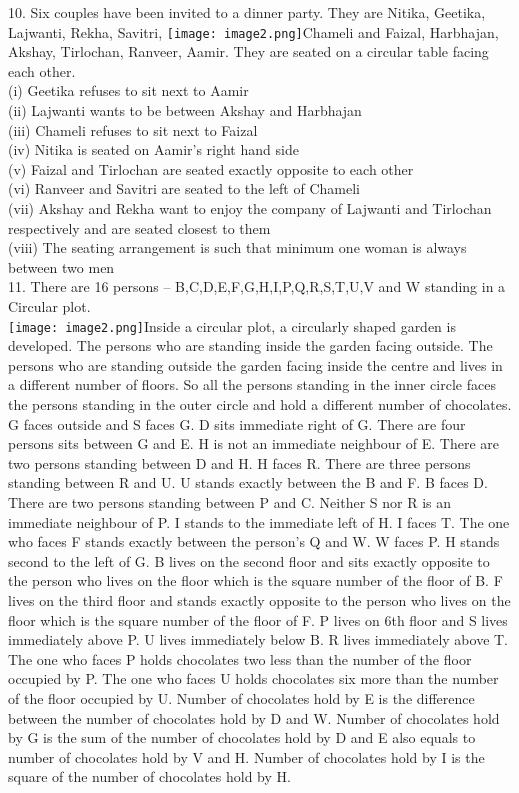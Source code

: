 \documentclass[
]{article}
\begin{document}
10. Six couples have been invited to a dinner party. They are Nitika, Geetika, Lajwanti, Rekha,
Savitri, \texttt{[image: image2.png]}Chameli and Faizal, Harbhajan, Akshay, Tirlochan, Ranveer, Aamir. They are seated
on a circular table facing each other.\\
(i) Geetika refuses to sit next to Aamir\\
(ii) Lajwanti wants to be between Akshay and Harbhajan\\
(iii) Chameli refuses to sit next to Faizal\\
(iv) Nitika is seated on Aamir's right hand side\\
(v) Faizal and Tirlochan are seated exactly opposite to each other\\
(vi) Ranveer and Savitri are seated to the left of Chameli\\
(vii) Akshay and Rekha want to enjoy the company of Lajwanti and Tirlochan respectively
and are seated closest to them\\
(viii) The seating arrangement is such that minimum one woman is always between two
men\\

11. There are 16 persons – B,C,D,E,F,G,H,I,P,Q,R,S,T,U,V and W standing in a Circular plot.\\
\texttt{[image: image2.png]}Inside a circular plot, a circularly shaped garden is developed. The persons who are
standing inside the garden facing outside. The persons who are standing outside the garden
facing inside the centre and lives in a different number of floors. So all the persons standing
in the inner circle faces the persons standing in the outer circle and hold a different number
of chocolates.\\
G faces outside and S faces G. D sits immediate right of G. There are four persons sits
between G and E. H is not an immediate neighbour of E. There are two persons standing
between D and H. H faces R. There are three persons standing between R and U. U stands
exactly between the B and F. B faces D. There are two persons standing between P and C.
Neither S nor R is an immediate neighbour of P. I stands to the immediate left of H. I faces
T. The one who faces F stands exactly between the person's Q and W. W faces P. H stands
second to the left of G. B lives on the second floor and sits exactly opposite to the person
who lives on the floor which is the square number of the floor of B. F lives on the third floor
and stands exactly opposite to the person who lives on the floor which is the square number
of the floor of F. P lives on 6th floor and S lives immediately above P. U lives immediately
below B. R lives immediately above T. The one who faces P holds chocolates two less than
the number of the floor occupied by P. The one who faces U holds chocolates six more than
the number of the floor occupied by U. Number of chocolates hold by E is the difference
between the number of chocolates hold by D and W. Number of chocolates hold by G is the
sum of the number of chocolates hold by D and E also equals to number of chocolates hold
by V and H. Number of chocolates hold by I is the square of the number of chocolates hold
by H.\\
\end{document}
